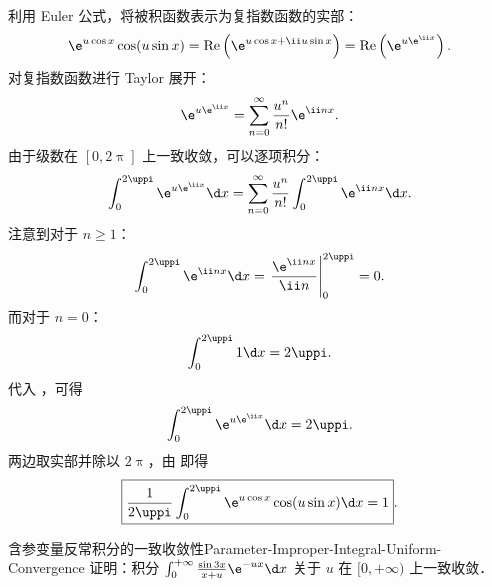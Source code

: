 \begin{myproof}
    利用 Euler 公式，将被积函数表示为复指数函数的实部：
    \begin{equation}\label{eq:euler-real-2}
        \e^{u \cos x} \cos(u \sin x) = \operatorname{Re} \left( \e^{u \cos x + \ii u \sin x} \right) = \operatorname{Re} \left( \e^{u \e^{\ii x}} \right).
    \end{equation}
    对复指数函数进行 Taylor 展开：
    \begin{equation}\label{eq:taylor-exp-3}
        \e^{u \e^{\ii x}} = \sum_{n=0}^{\infty} \frac{u^n}{n!} \e^{\ii n x}.
    \end{equation}
    由于级数在 $[0, 2\uppi]$ 上一致收敛，可以逐项积分：
    \begin{equation}\label{eq:term-by-term-4}
        \int_0^{2\uppi} \e^{u \e^{\ii x}} \d x = \sum_{n=0}^{\infty} \frac{u^n}{n!} \int_0^{2\uppi} \e^{\ii n x} \d x.
    \end{equation}
    注意到对于 $n \geqslant 1$：
    \begin{equation}\label{eq:n-nonzero-5}
        \int_0^{2\uppi} \e^{\ii n x} \d x = \left. \frac{\e^{\ii n x}}{\ii n} \right|_0^{2\uppi} = 0.
    \end{equation}
    而对于 $n = 0$：
    \begin{equation}\label{eq:n-zero-6}
        \int_0^{2\uppi} 1 \d x = 2\uppi.
    \end{equation}
    代入 ，可得
    \begin{equation}\label{eq:integral-complex-7}
        \int_0^{2\uppi} \e^{u \e^{\ii x}} \d x = 2\uppi.
    \end{equation}
    两边取实部并除以 $2\uppi$，由  即得
    \begin{equation}\label{eq:q5-final-8}
        \boxed{\frac{1}{2\uppi} \int_0^{2\uppi} \e^{u \cos x} \cos(u \sin x) \d x = 1}.
    \end{equation}
\end{myproof}

\begin{problem}{含参变量反常积分的一致收敛性}{Parameter-Improper-Integral-Uniform-Convergence}
    证明：积分 $\int_0^{+\infty} \frac{\sin 3x}{x+u} \e^{-ux} \d x$ 关于 $u$ 在 $[0,+\infty)$ 上一致收敛．
\end{problem}

